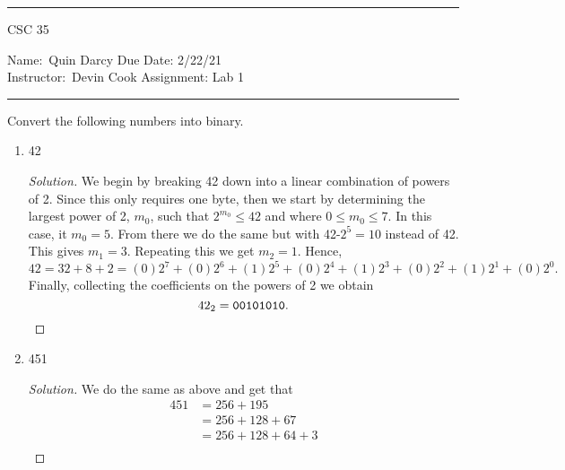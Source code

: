 \documentclass[12pt]{article}
\theoremstyle{definition}
\newenvironment{solution}
{\renewcommand\qedsymbol{$\blacksquare$}\begin{proof}[Solution]}
{\end{proof}}
\begin{document}
    \thispagestyle{empty}\hrule

    \begin{center}
        \vspace{.4cm} { \large CSC 35}
    \end{center}
    {Name:\ Quin Darcy \hspace{\fill} Due Date: 2/22/21  \\
    { Instructor:}\ Devin Cook \hspace{\fill} Assignment:
    Lab 1 \\ \hrule} 
    \vspace{4mm}

    Convert the following numbers into binary.
    \begin{enumerate}
        \item 42
            \begin{solution}
                We begin by breaking 42 down into a linear combination of
                powers of 2. Since this only requires one byte, then we start
                by determining the largest power of 2, $m_0$, such that
                $2^{m_0}\leq
                42$ and where $0\leq m_0\leq 7$. In this case, it $m_0=5$. 
                From there we do the same but with 42-$2^5=10$ instead of 42. 
                This gives $m_1=3$. Repeating this we get
                $m_2=1$. Hence,
                    \begin{equation*}
                        42 = 32 + 8 + 2=
                        (0)2^7+(0)2^6+(1)2^5+(0)2^4+(1)2^3+(0)2^2+(1)2^1+(0)2^0.
                    \end{equation*}
                Finally, collecting the coefficients on the powers of 2 we
                obtain
                    \begin{equation*}
                        42_2 = \text{\texttt{00101010}}.
                    \end{equation*}
            \end{solution}
        \item 451
            \begin{solution}
                We do the same as above and get that 
                    \begin{equation*}
                        \begin{split}
                            451 &= 256+195 \\
                            &= 256 +128+67 \\
                            &=256+128+64+3 \\

\end{split}
\end{equation*}
\end{solution}
\end{enumerate}
\end{document}
